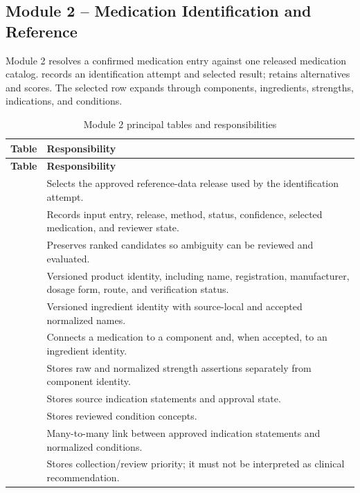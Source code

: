 \subsection{Module 2 -- Medication Identification and Reference}

Module 2 resolves a confirmed medication entry against one released medication catalog.  records an identification attempt and selected result;  retains alternatives and scores. The selected  row expands through components, ingredients, strengths, indications, and conditions.


\begin{longtable}{L{4.5cm}L{10.8cm}}
\caption{Module 2 principal tables and responsibilities}\label{tab:module2-tables}\\
\toprule
\textbf{Table} & \textbf{Responsibility}\\
\midrule
\endfirsthead
\toprule
\textbf{Table} & \textbf{Responsibility}\\
\midrule
\endhead
{} & Selects the approved reference-data release used by the identification attempt.\\
 & Records input entry, release, method, status, confidence, selected medication, and reviewer state.\\
 & Preserves ranked candidates so ambiguity can be reviewed and evaluated.\\
 & Versioned product identity, including name, registration, manufacturer, dosage form, route, and verification status.\\
 & Versioned ingredient identity with source-local and accepted normalized names.\\
 & Connects a medication to a component and, when accepted, to an ingredient identity.\\
 & Stores raw and normalized strength assertions separately from component identity.\\
 & Stores source indication statements and approval state.\\
 & Stores reviewed condition concepts.\\
 & Many-to-many link between approved indication statements and normalized conditions.\\
 & Stores collection/review priority; it must not be interpreted as clinical recommendation.\\
\bottomrule
\end{longtable}

